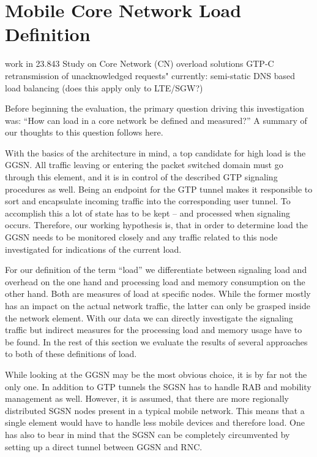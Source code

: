 


\section{Mobile Core Network Load Definition}
\label{c4:loaddefinition}

work in 23.843 \cite{3gpp.23.843} Study on Core Network (CN) overload solutions
GTP-C retransmission of unacknowledged requests"
currently: semi-static DNS based load balancing (does this apply only to LTE/SGW?)


Before beginning the evaluation, the primary question driving this investigation was: ``How can load in a core network be defined and measured?'' A summary of our thoughts to this question follows here.

With the basics of the architecture in mind, a top candidate for high load is the \gls{GGSN}. All traffic leaving or entering the packet switched domain must go through this element, and it is in control of the described GTP signaling procedures as well. Being an endpoint for the GTP tunnel makes it responsible to sort and encapsulate incoming traffic into the corresponding user tunnel. To accomplish this a lot of state has to be kept -- and processed when signaling occurs. Therefore, our working hypothesis is, that in order to determine load the \gls{GGSN} needs to be monitored closely and any traffic related to this node investigated for indications of the current load.

For our definition of the term ``load'' we differentiate between signaling load and overhead on the one hand and processing load and memory consumption on the other hand. Both are measures of load at specific nodes. While the former mostly has an impact on the actual network traffic, the latter can only be grasped inside the network element. With our data we can directly investigate the signaling traffic but indirect measures for the processing load and memory usage have to be found. In the rest of this section we evaluate the results of several approaches to both of these definitions of load.

While looking at the \gls{GGSN} may be the most obvious choice, it is by far not the only one. 
In addition to GTP tunnels the \gls{SGSN} has to handle \gls{RAB} and mobility management as well. However, it is assumed, that there are more regionally distributed \gls{SGSN} nodes present in a typical mobile network. This means that a single element would have to handle less mobile devices and therefore load. One has also to bear in mind that the \gls{SGSN} can be completely circumvented by setting up a direct tunnel between \gls{GGSN} and \gls{RNC}.

